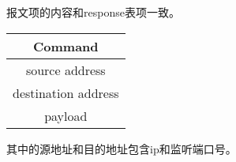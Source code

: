 \documentclass[15pt]{ctexart}
\begin{document}
报文项的内容和response表项一致。
\begin{table}[H]
	\centering
	\begin{tabular}{|c|}
		\hline
		Command \\
		\hline
		source address \\
		\hline
		destination address \\
		\hline
		payload \\
		\hline
	\end{tabular}		
\end{table}
其中的源地址和目的地址包含ip和监听端口号。
\end{document}
